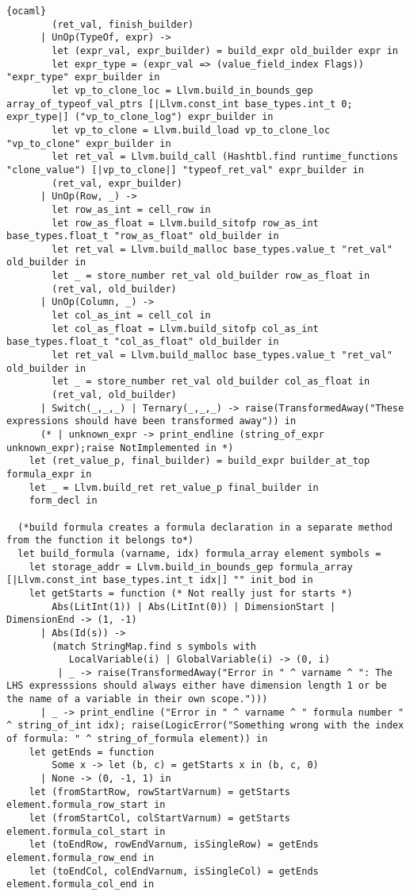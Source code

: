 \begin{lstlisting}{ocaml}
        (ret_val, finish_builder)
      | UnOp(TypeOf, expr) ->
        let (expr_val, expr_builder) = build_expr old_builder expr in
        let expr_type = (expr_val => (value_field_index Flags)) "expr_type" expr_builder in
        let vp_to_clone_loc = Llvm.build_in_bounds_gep array_of_typeof_val_ptrs [|Llvm.const_int base_types.int_t 0; expr_type|] ("vp_to_clone_log") expr_builder in
        let vp_to_clone = Llvm.build_load vp_to_clone_loc "vp_to_clone" expr_builder in
        let ret_val = Llvm.build_call (Hashtbl.find runtime_functions "clone_value") [|vp_to_clone|] "typeof_ret_val" expr_builder in
        (ret_val, expr_builder)
      | UnOp(Row, _) ->
        let row_as_int = cell_row in
        let row_as_float = Llvm.build_sitofp row_as_int base_types.float_t "row_as_float" old_builder in
        let ret_val = Llvm.build_malloc base_types.value_t "ret_val" old_builder in
        let _ = store_number ret_val old_builder row_as_float in
        (ret_val, old_builder)
      | UnOp(Column, _) ->
        let col_as_int = cell_col in
        let col_as_float = Llvm.build_sitofp col_as_int base_types.float_t "col_as_float" old_builder in
        let ret_val = Llvm.build_malloc base_types.value_t "ret_val" old_builder in
        let _ = store_number ret_val old_builder col_as_float in
        (ret_val, old_builder)
      | Switch(_,_,_) | Ternary(_,_,_) -> raise(TransformedAway("These expressions should have been transformed away")) in
      (* | unknown_expr -> print_endline (string_of_expr unknown_expr);raise NotImplemented in *)
    let (ret_value_p, final_builder) = build_expr builder_at_top formula_expr in
    let _ = Llvm.build_ret ret_value_p final_builder in
    form_decl in

  (*build formula creates a formula declaration in a separate method from the function it belongs to*)
  let build_formula (varname, idx) formula_array element symbols =
    let storage_addr = Llvm.build_in_bounds_gep formula_array [|Llvm.const_int base_types.int_t idx|] "" init_bod in
    let getStarts = function (* Not really just for starts *)
        Abs(LitInt(1)) | Abs(LitInt(0)) | DimensionStart | DimensionEnd -> (1, -1)
      | Abs(Id(s)) ->
        (match StringMap.find s symbols with
           LocalVariable(i) | GlobalVariable(i) -> (0, i)
         | _ -> raise(TransformedAway("Error in " ^ varname ^ ": The LHS expresssions should always either have dimension length 1 or be the name of a variable in their own scope.")))
      | _ -> print_endline ("Error in " ^ varname ^ " formula number " ^ string_of_int idx); raise(LogicError("Something wrong with the index of formula: " ^ string_of_formula element)) in
    let getEnds = function
        Some x -> let (b, c) = getStarts x in (b, c, 0)
      | None -> (0, -1, 1) in
    let (fromStartRow, rowStartVarnum) = getStarts element.formula_row_start in
    let (fromStartCol, colStartVarnum) = getStarts element.formula_col_start in
    let (toEndRow, rowEndVarnum, isSingleRow) = getEnds element.formula_row_end in
    let (toEndCol, colEndVarnum, isSingleCol) = getEnds element.formula_col_end in


\end{lstlisting}
